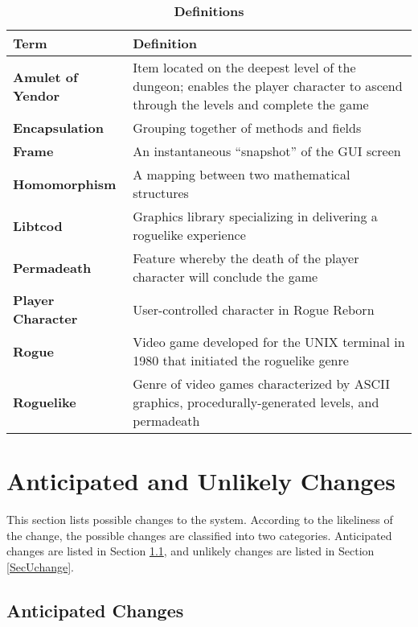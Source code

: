 \documentclass[12pt, titlepage]{article}
\newcommand{\newSection}[1]{
  \newpage
  \section{#1}
}
\begin{document}
        \begin{table}[H]
            \centering
            \caption{\bf Definitions}
            \label{TableDefinitions}
            \bigskip
            \def\arraystretch{1.5}
            \begin{tabularx}{\textwidth}{p{3.7cm}X}
                \toprule
                \textbf{Term} & \textbf{Definition}\\
                \midrule
                \textbf{Amulet of Yendor} & Item located on the deepest level of the dungeon; enables the player character to ascend through the levels and complete the game\\
                \textbf{Encapsulation} & Grouping together of methods and fields\\
                \textbf{Frame} & An instantaneous ``snapshot'' of the GUI screen\\
                \textbf{Homomorphism} & A mapping between two mathematical structures\\
                \textbf{Libtcod} & Graphics library specializing in delivering a roguelike experience\\
                \textbf{Permadeath} & Feature whereby the death of the player character will conclude the game\\
                \textbf{Player Character} & User-controlled character in Rogue Reborn\\
                \textbf{Rogue} & Video game developed for the UNIX terminal in 1980 that initiated the roguelike genre\\
                \textbf{Roguelike} & Genre of video games characterized by ASCII graphics, procedurally-generated levels, and permadeath\\
                \bottomrule
            \end{tabularx}
        \end{table} 

\newSection{Anticipated and Unlikely Changes} \label{SecChange}

    This section lists possible changes to the system. According to the likeliness of the change, the possible changes are classified into two  categories. Anticipated changes are listed in Section \ref{SecAchange}, and unlikely changes are listed in Section \ref{SecUchange}.

    \subsection{Anticipated Changes} \label{SecAchange}
\end{document}
